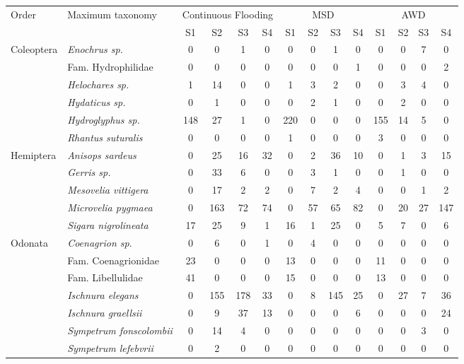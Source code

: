 \begin{table} [htbp]
    \centering
    \scriptsize  
    \begin{tabular}{l | l | c c c c | c c c c | c c c c}
    \cline{1-14}
\multirow{2}{2.3cm}{Order} & \multirow{2}{3cm}{Maximum taxonomy} & \multicolumn{4}{c}{Continuous Flooding}  & \multicolumn{4}{c}{MSD} &  \multicolumn{4}{c}{AWD}  \\
    \cline{3-14}
& & S1 & S2 & S3 & S4 & S1 & S2 & S3 & S4 & S1 & S2 & S3 & S4\\
    \cline{1-14}
\multirow{6}{2.3cm}{Coleoptera}  & \textit{Enochrus  sp.} & 0 & 0 & 1 & 0 & 0 & 0 & 1 & 0 & 0 & 0 & 7 & 0\\
& Fam. Hydrophilidae & 0 & 0 & 0 & 0 & 0 & 0 & 0 & 1 & 0 & 0 & 0 & 2\\
& \textit{Helochares sp.} & 1 & 14 & 0 & 0 & 1 & 3 & 2 & 0 & 0 & 3 & 4 & 0\\
& \textit{Hydaticus  sp.} & 0 & 1 & 0 & 0 & 0 & 2 & 1 & 0 & 0 & 2 & 0 & 0\\
& \textit{Hydroglyphus sp.} & 148 & 27 & 1 & 0 & 220 & 0 & 0 & 0 & 155 & 14 & 5 & 0\\
& \textit{Rhantus suturalis} & 0 & 0 & 0 & 0 & 1 & 0 & 0 & 0 & 3 & 0 & 0 & 0\\
    \cline{1-14}
\multirow{5}{2.3cm}{Hemiptera} & \textit{Anisops sardeus} & 0 & 25 & 16 & 32 & 0 & 2 & 36 & 10 & 0 & 1 & 3 & 15\\
& \textit{Gerris sp.} & 0 & 33 & 6 & 0 & 0 & 3 & 1 & 0 & 0 & 1 & 0 & 0\\
& \textit{Mesovelia vittigera} & 0 & 17 & 2 & 2 & 0 & 7 & 2 & 4 & 0 & 0 & 1 & 2\\
& \textit{Microvelia pygmaea} & 0 & 163 & 72 & 74 & 0 & 57 & 65 & 82 & 0 & 20 & 27 & 147\\
& \textit{Sigara nigrolineata} & 17 & 25 & 9 & 1 & 16 & 1 & 25 & 0 & 5 & 7 & 0 & 6\\
    \cline{1-14}
\multirow{7}{2.3cm}{Odonata} & \textit{Coenagrion sp}. & 0 & 6 & 0 & 1 & 0 & 4 & 0 & 0 & 0 & 0 & 0 & 0\\
& Fam. Coenagrionidae & 23 & 0 & 0 & 0 & 13 & 0 & 0 & 0 & 11 & 0 & 0 & 0\\
& Fam. Libellulidae & 41 & 0 & 0 & 0 & 15 & 0 & 0 & 0 & 13 & 0 & 0 & 0\\
& \textit{Ischnura elegans} & 0 & 155 & 178 & 33 & 0 & 8 & 145 & 25 & 0 & 27 & 7 & 36\\
& \textit{Ischnura graellsii} & 0 & 9 & 37 & 13 & 0 & 0 & 0 & 6 & 0 & 0 & 0 & 24\\
& \textit{Sympetrum fonscolombii} & 0 & 14 & 4 & 0 & 0 & 0 & 0 & 0 & 0 & 0 & 3 & 0\\
& \textit{Sympetrum lefebvrii} & 0 & 2 & 0 & 0 & 0 & 0 & 0 & 0 & 0 & 0 & 0 & 0\\


\end{tabular}
\end{table}
